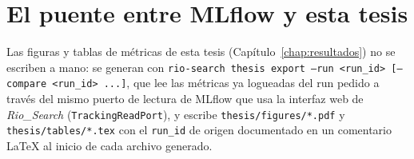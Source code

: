 \section{El puente entre MLflow y esta tesis}

Las figuras y tablas de m\'etricas de esta tesis (Cap\'itulo~\ref{chap:resultados}) no se escriben
a mano: se generan con \texttt{rio-search thesis export --run \textless run\_id\textgreater{}
[--compare \textless run\_id\textgreater{} ...]}, que lee las m\'etricas ya logueadas del run
pedido a trav\'es del mismo puerto de lectura de MLflow que usa la interfaz web de
\emph{Rio\_Search} (\texttt{TrackingReadPort}), y escribe \texttt{thesis/figures/*.pdf} y
\texttt{thesis/tables/*.tex} con el \texttt{run\_id} de origen documentado en un comentario LaTeX
al inicio de cada archivo generado.
